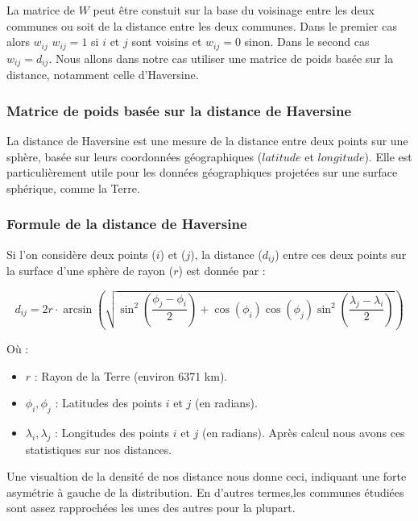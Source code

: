 \documentclass[
]{article}
\begin{document}
La matrice de \(W\) peut être constuit sur la base du voisinage entre
les deux communes ou soit de la distance entre les deux communes. Dans
le premier cas alors \(w_{ij}\) \(w_{ij} = 1\) si \(i\) et \(j\) sont
voisins et \(w_{ij} = 0\) sinon. Dans le second cas \(w_{ij} = d_{ij}\).
Nous allons dans notre cas utiliser une matrice de poids basée sur la
distance, notamment celle d'Haversine.

\hypertarget{matrice-de-poids-basuxe9e-sur-la-distance-de-haversine}{%
\subsubsection{Matrice de poids basée sur la distance de
Haversine}\label{matrice-de-poids-basuxe9e-sur-la-distance-de-haversine}}

La distance de Haversine est une mesure de la distance entre deux points
sur une sphère, basée sur leurs coordonnées géographiques (\(latitude\)
et \(longitude\)). Elle est particulièrement utile pour les données
géographiques projetées sur une surface sphérique, comme la Terre.

\hypertarget{formule-de-la-distance-de-haversine}{%
\subsubsection{Formule de la distance de
Haversine}\label{formule-de-la-distance-de-haversine}}

Si l'on considère deux points (\(i\)) et (\(j\)), la distance
(\(d_{ij}\)) entre ces deux points sur la surface d'une sphère de rayon
(\(r\)) est donnée par :

\[
 d_{ij} = 2r \cdot \arcsin\left(\sqrt{\sin^2\left(\frac{\phi_j - \phi_i}{2}\right) + \cos(\phi_i)\cos(\phi_j)\sin^2\left(\frac{\lambda_j - \lambda_i}{2}\right)}\right)
\]

Où :

\begin{itemize}
\item
  \(r\) : Rayon de la Terre (environ 6371 km).
\item
  \(\phi_i, \phi_j\) : Latitudes des points \(i\) et \(j\) (en radians).
\item
  \(\lambda_i, \lambda_j\) : Longitudes des points \(i\) et \(j\) (en
  radians). Après calcul nous avons ces statistiques sur nos distances.
\end{itemize}

Une visualtion de la densité de nos distance nous donne ceci, indiquant
une forte asymétrie à gauche de la distribution. En d'autres termes,les
communes étudiées sont assez rapprochées les unes des autres pour la
plupart.
\end{document}
